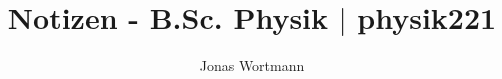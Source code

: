 \documentclass[a4paper,12pt]{article}
\numberwithin{equation}{section}
\begin{document}

\title{Notizen - B.Sc. Physik $|$ physik221}
\author{Jonas Wortmann}
\maketitle
{}


\newpage



\fancyhead[L]{\thepage}
\fancyfoot[C]{}

\tableofcontents


\newpage


\fancyhead[R]{\leftmark\\\rightmark}
\end{document}
